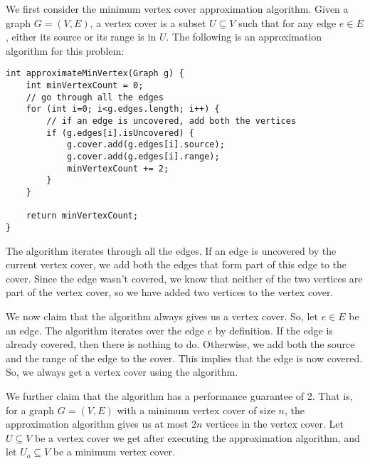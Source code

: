\documentclass[a4paper, openany]{memoir}
\begin{document}
    We first consider the minimum vertex cover approximation algorithm. Given a graph $G = (V, E)$, a vertex cover is a subset $U \subseteq V$ such that for any edge $e \in E$, either its source or its range is in $U$. The following is an approximation algorithm for this problem:
\begin{lstlisting}[language=pseudocode]
int approximateMinVertex(Graph g) {
    int minVertexCount = 0;
    // go through all the edges
    for (int i=0; i<g.edges.length; i++) {
        // if an edge is uncovered, add both the vertices
        if (g.edges[i].isUncovered) {
            g.cover.add(g.edges[i].source);
            g.cover.add(g.edges[i].range);
            minVertexCount += 2;
        }
    }

    return minVertexCount;
}
\end{lstlisting}
    The algorithm iterates through all the edges. If an edge is uncovered by the current vertex cover, we add both the edges that form part of this edge to the cover. Since the edge wasn't covered, we know that neither of the two vertices are part of the vertex cover, so we have added two vertices to the vertex cover.
    
    We now claim that the algorithm always gives us a vertex cover. So, let $e \in E$ be an edge. The algorithm iterates over the edge $e$ by definition. If the edge is already covered, then there is nothing to do. Otherwise, we add both the source and the range of the edge to the cover. This implies that the edge is now covered. So, we always get a vertex cover using the algorithm.

    We further claim that the algorithm has a performance guarantee of 2. That is, for a graph $G = (V, E)$ with a minimum vertex cover of size $n$, the approximation algorithm gives us at most $2n$ vertices in the vertex cover. Let $U \subseteq V$ be a vertex cover we get after executing the approximation algorithm, and let $U_o \subseteq V$ be a minimum vertex cover.
\end{document}
